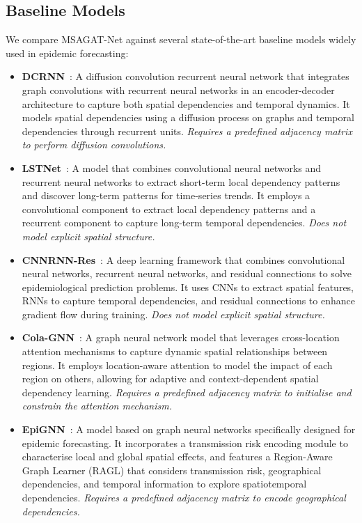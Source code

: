 \documentclass[a4paper,fleqn]{cas-dc}
\begin{document}
\subsection{Baseline Models}
\label{sec:baseline_models}

We compare MSAGAT-Net against several state-of-the-art baseline models widely used in epidemic forecasting:

\begin{itemize}
    \item \textbf{DCRNN}~\cite{li2017diffusion}: A diffusion convolution recurrent neural network that integrates graph convolutions with recurrent neural networks in an encoder-decoder architecture to capture both spatial dependencies and temporal dynamics. It models spatial dependencies using a diffusion process on graphs and temporal dependencies through recurrent units. \textit{Requires a predefined adjacency matrix to perform diffusion convolutions.}
    
    \item \textbf{LSTNet}~\cite{lai2018modeling}: A model that combines convolutional neural networks and recurrent neural networks to extract short-term local dependency patterns and discover long-term patterns for time-series trends. It employs a convolutional component to extract local dependency patterns and a recurrent component to capture long-term temporal dependencies. \textit{Does not model explicit spatial structure.}
    
    \item \textbf{CNNRNN-Res}~\cite{wu2018deep}: A deep learning framework that combines convolutional neural networks, recurrent neural networks, and residual connections to solve epidemiological prediction problems. It uses CNNs to extract spatial features, RNNs to capture temporal dependencies, and residual connections to enhance gradient flow during training. \textit{Does not model explicit spatial structure.}
    
    \item \textbf{Cola-GNN}~\cite{dengColaGNNCrosslocationAttention2020a}: A graph neural network model that leverages cross-location attention mechanisms to capture dynamic spatial relationships between regions. It employs location-aware attention to model the impact of each region on others, allowing for adaptive and context-dependent spatial dependency learning. \textit{Requires a predefined adjacency matrix to initialise and constrain the attention mechanism.}
    
    \item \textbf{EpiGNN}~\cite{xie2022epignn}: A model based on graph neural networks specifically designed for epidemic forecasting. It incorporates a transmission risk encoding module to characterise local and global spatial effects, and features a Region-Aware Graph Learner (RAGL) that considers transmission risk, geographical dependencies, and temporal information to explore spatiotemporal dependencies. \textit{Requires a predefined adjacency matrix to encode geographical dependencies.}
\end{itemize}
\end{document}
